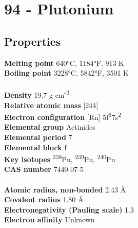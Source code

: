 \section{94 - Plutonium}
\label{sec:elem-plutonium}
\subsection{Properties}
\textbf{Melting point} 640°C, 1184°F, 913 K\\
\textbf{Boiling point} 3228°C, 5842°F, 3501 K\\
\\
\textbf{Density} 19.7 g cm\textsuperscript{-3}\\
\textbf{Relative atomic mass} [244]\\
\textbf{Electron configuration} [Rn] 5f\textsuperscript{6}7s\textsuperscript{2}\\
\textbf{Elemental group} Actinides\\
\textbf{Elemental period} 7\\
\textbf{Elemental block} f\\
\textbf{Key isotopes} \textsuperscript{238}Pu, \textsuperscript{239}Pu, \textsuperscript{240}Pu\\
\textbf{CAS number} 7440-07-5\\
\\
\textbf{Atomic radius, non-bonded} 2.43 Å\\
\textbf{Covalent radius} 1.80 Å\\
\textbf{Electronegativity (Pauling scale)} 1.3\\
\textbf{Electron affinity} Unknown\\